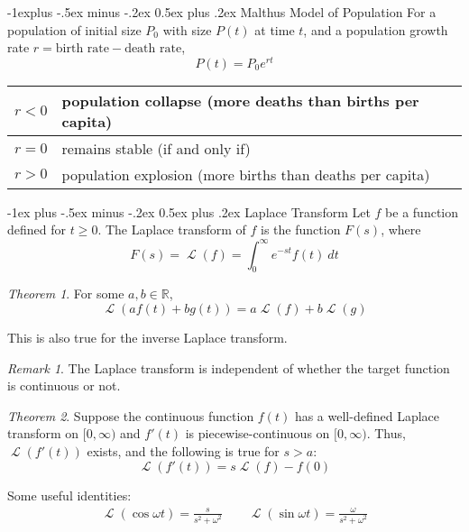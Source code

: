 \documentclass[10pt,landscape]{article}
\makeatletter
\theoremstyle{remark}
\newtheorem*{remark}{Remark}
\newtheorem*{theorem}{Theorem}
\DeclareMathOperator{\Lapl}{\mathcal{L}}
\renewcommand{\section}{\@startsection{section}{1}{0mm}%
                                {-1ex plus -.5ex minus -.2ex}%
                                {0.5ex plus .2ex}%
                                {\normalfont\large\bfseries}}
\renewcommand{\subsection}{\@startsection{subsection}{2}{0mm}%
                                {-1explus -.5ex minus -.2ex}%
                                {0.5ex plus .2ex}%
                                {\normalfont\normalsize\bfseries}}
\makeatother
\begin{document}
\begin{multicols}{3}
\subsection{Malthus Model of Population}
For a population of initial size $P_0$ with size $P(t)$ at time $t$, and a population growth rate $r = \text{birth rate} - \text{death rate}$,
\begin{equation}
	P(t) = P_0 e^{rt}
\end{equation}
\begin{tabular}{rl}
	\hline
	$r < 0$ & population collapse (more deaths than births per capita) \\\hline
	$r = 0$ & remains stable (if and only if) \\\hline
	$r > 0$ & population explosion (more births than deaths per capita)\\\hline
\end{tabular}

\section{Laplace Transform}
Let $f$ be a function defined for $t \geq 0$.
The Laplace transform of $f$ is the function $F(s)$, where
\begin{equation}
	F(s) = \Lapl(f) = \int_0^\infty e^{-st} f(t)\: dt
\end{equation}

\begin{theorem}
	For some $a,b\in\mathbb{R}$,
	$$\Lapl(af(t)+bg(t)) = a\Lapl(f) + b\Lapl(g)$$

	This is also true for the inverse Laplace transform.
\end{theorem}

\begin{remark}
The Laplace transform is independent of whether the target function is continuous or not.
\end{remark}

\begin{theorem}
	Suppose the continuous function $f(t)$ has a well-defined Laplace transform on $[0,\infty)$ and $f'(t)$ is piecewise-continuous on $[0,\infty)$.
	Thus, $\Lapl(f'(t))$ exists, and the following is true for $s>a$:
	$$\Lapl(f'(t)) = s\Lapl(f) - f(0)$$
\end{theorem}

Some useful identities:
\begin{align}
	\Lapl(\cos{\omega t}) = \frac{s}{s^2+\omega^2} \qquad \Lapl(\sin{\omega t}) = \frac{\omega}{s^2+\omega^2} 
\end{align}


\end{multicols}
\end{document}
